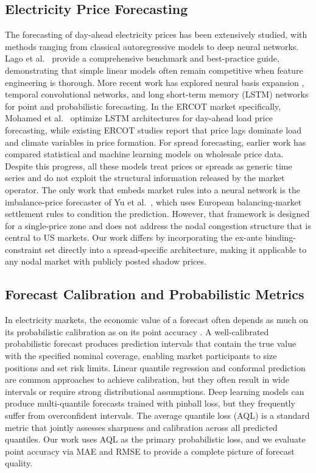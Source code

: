 \documentclass{article}
\begin{document}
\subsection{Electricity Price Forecasting}
The forecasting of day-ahead electricity prices has been extensively studied, with methods ranging from classical autoregressive models to deep neural networks. Lago et al.~\cite{lago2020forecasting} provide a comprehensive benchmark and best-practice guide, demonstrating that simple linear models often remain competitive when feature engineering is thorough. More recent work has explored neural basis expansion \cite{olivares2022neural}, temporal convolutional networks, and long short-term memory (LSTM) networks \cite{hewamalage2020recurrent} for point and probabilistic forecasting. In the ERCOT market specifically, Mohamed et al.~\cite{mohamed2025bollpp} optimize LSTM architectures for day-ahead load price forecasting, while existing ERCOT studies report that price lags dominate load and climate variables in price formation. For spread forecasting, earlier work has compared statistical and machine learning models on wholesale price data. Despite this progress, all these models treat prices or spreads as generic time series and do not exploit the structural information released by the market operator. The only work that embeds market rules into a neural network is the imbalance-price forecaster of Yu et al.~\cite{yu2026marketruleinformed}, which uses European balancing-market settlement rules to condition the prediction. However, that framework is designed for a single-price zone and does not address the nodal congestion structure that is central to US markets. Our work differs by incorporating the ex-ante binding-constraint set directly into a spread-specific architecture, making it applicable to any nodal market with publicly posted shadow prices.

\subsection{Forecast Calibration and Probabilistic Metrics}
In electricity markets, the economic value of a forecast often depends as much on its probabilistic calibration as on its point accuracy \cite{abdar2021review}. A well-calibrated probabilistic forecast produces prediction intervals that contain the true value with the specified nominal coverage, enabling market participants to size positions and set risk limits. Linear quantile regression and conformal prediction are common approaches to achieve calibration, but they often result in wide intervals or require strong distributional assumptions. Deep learning models can produce multi-quantile forecasts trained with pinball loss, but they frequently suffer from overconfident intervals. The average quantile loss (AQL) is a standard metric that jointly assesses sharpness and calibration across all predicted quantiles. Our work uses AQL as the primary probabilistic loss, and we evaluate point accuracy via MAE and RMSE to provide a complete picture of forecast quality.
\end{document}
